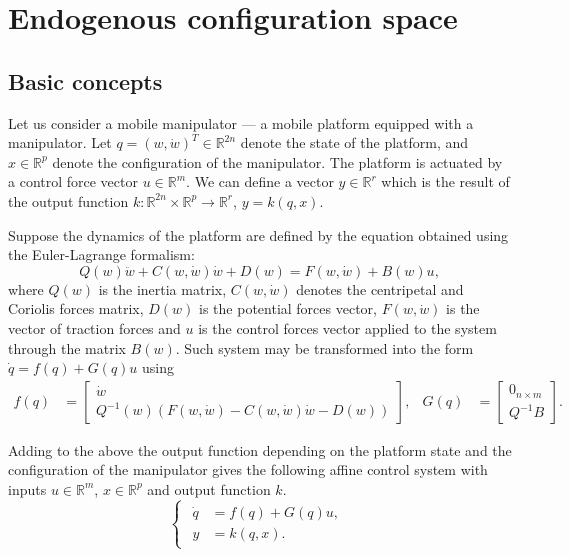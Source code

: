 \chapter{Endogenous configuration space}
\label{ch:endogen}
\section{Basic concepts}
Let us consider a mobile manipulator --- a mobile platform equipped with a manipulator. Let $q = (w, \dot w)^T \in \mathbb{R}^{2n}$ denote the state of the platform, and $x \in \mathbb{R}^p$ denote the configuration of the manipulator. The platform is actuated by a control force vector $u \in \mathbb{R}^m$. We can define a vector $y \in \mathbb{R}^r$ which is the result of the output function $k: \mathbb{R}^{2n} \times \mathbb{R}^p \rightarrow \mathbb{R}^r$, $y=k(q,x)$. 

Suppose the dynamics of the platform are defined by the equation obtained using the Euler-Lagrange formalism:
\begin{equation}
Q(w)\ddot w + C(w, \dot{w})\dot{w}+D(w)=F(w, \dot w)+B(w)u,
\end{equation}
where $Q(w)$ is the inertia matrix, $C(w, \dot w)$ denotes the centripetal and Coriolis forces matrix,
$D(w)$ is the potential forces vector, $F(w, \dot w)$ is the vector of traction forces and $u$ is the
control forces vector applied to the system through the matrix $B(w)$.
Such system may be transformed into the form $\dot q = f(q) + G(q)u$ using
\begin{equation}
\begin{aligned}
f(q)&=\begin{bmatrix}
\dot{w}\\
Q^{-1}(w)\left(F(w, \dot w)-C(w, \dot{w})\dot{w}-D(w)\right)
\end{bmatrix}, & G(q)&=\begin{bmatrix}
0_{n\times m}\\
Q^{-1}B
\end{bmatrix}.
\end{aligned}
\end{equation}

Adding to the above the output function depending on the platform state and the configuration of the manipulator gives the following affine control system with inputs
$u \in \mathbb{R}^m$, $x \in \mathbb{R}^p$ and output function $k$.
\begin{equation}
\begin{cases}
\begin{aligned}
\label{eq:control_sys}
\dot q &= f(q) + G(q)u,\\
y &= k(q, x).
\end{aligned}
\end{cases}
\end{equation}

